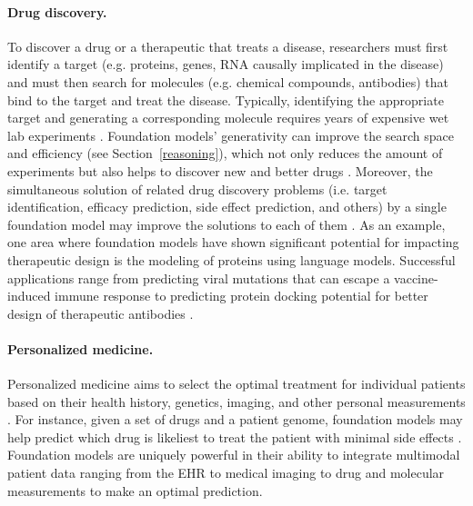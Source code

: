\paragraph{Drug discovery.} To discover a drug or a therapeutic that treats a disease, researchers must first identify a target (e.g. proteins, genes, RNA causally implicated in the disease) and must then search for molecules (e.g. chemical compounds, antibodies) that bind to the target and treat the disease. Typically, identifying the appropriate target and generating a corresponding molecule requires years of expensive wet lab experiments \citep{hughes2011principles, schenone2013target, schneider2018automating}. Foundation models' generativity can improve the search space and efficiency (see Section~\ref{reasoning}), which not only reduces the amount of experiments but also helps to discover new and better drugs \citep{jin2018junction, you2018graph,walters2020applications, stokes2020deep}. Moreover, the simultaneous solution of related drug discovery problems (i.e. target identification, efficacy prediction, side effect prediction, and others) by a single foundation model may improve the solutions to each of them \citep{ramsundar2015massively, camacho2018next, duran2020extending, huang2021therapeutics}. As an example, one area where foundation models have shown significant potential for impacting therapeutic design is the modeling of proteins using language models. Successful applications range from predicting viral mutations that can escape a vaccine-induced immune response to predicting protein docking potential for better design of therapeutic antibodies \citep{bepler2021learning, hie2021learning, tsaban2021harnessing, wu2021protein, rives2021}.

\paragraph{Personalized medicine.} Personalized medicine aims to select the optimal treatment for individual patients based on their health history, genetics, imaging, and other personal measurements \citep{collins2015new, ashley2016towards}. For instance, given a set of drugs and a patient genome, foundation models may help predict which drug is likeliest to treat the patient with minimal side effects \citep{whirl2012pharmacogenomics, tatonetti2012data, gerstung2017precision, grinfeld2018classification, adam2020machine}. Foundation models are uniquely powerful in their ability to integrate multimodal patient data ranging from the EHR \citep{rajkomar2018scalable} to medical imaging \citep{bera2019artificial,ouyang2020video} to drug and molecular measurements \citep{gottlieb2011predict, ruiz2020identification} to make an optimal prediction.

